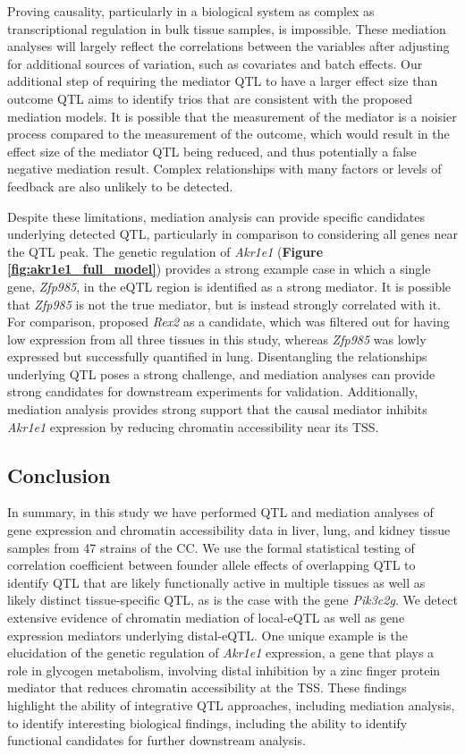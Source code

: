 \documentclass[9pt,twocolumn,twoside]{gsajnl}
\begin{document}
Proving causality, particularly in a biological system as complex as transcriptional regulation in bulk tissue samples, is impossible. These mediation analyses will largely reflect the correlations between the variables after adjusting for additional sources of variation, such as covariates and batch effects. Our additional step of requiring the mediator QTL to have a larger effect size than outcome QTL aims to identify trios that are consistent with the proposed mediation models. It is possible that the measurement of the mediator is a noisier process compared to the measurement of the outcome, which would result in the effect size of the mediator QTL being reduced, and thus potentially a false negative mediation result. Complex relationships with many factors or levels of feedback are also unlikely to be detected.

Despite these limitations, mediation analysis can provide specific candidates underlying detected QTL, particularly in comparison to considering all genes near the QTL peak. The genetic regulation of \textit{Akr1e1} (\textbf{Figure \ref{fig:akr1e1_full_model}}) provides a strong example case in which a single gene, \textit{Zfp985}, in the eQTL region is identified as a strong mediator. It is possible that \textit{Zfp985} is not the true mediator, but is instead strongly correlated with it. For comparison, \cite{HamiltonWilliams2013} proposed \textit{Rex2} as a candidate, which was filtered out for having low expression from all three tissues in this study, whereas \textit{Zfp985} was lowly expressed but successfully quantified in lung. Disentangling the relationships underlying QTL poses a strong challenge, and mediation analyses can provide strong candidates for downstream experiments for validation. Additionally, mediation analysis provides strong support that the causal mediator inhibits \textit{Akr1e1} expression by reducing chromatin accessibility near its TSS.

\subsection{Conclusion}

In summary, in this study we have performed QTL and mediation analyses of gene expression and chromatin accessibility data in liver, lung, and kidney tissue samples from 47 strains of the CC. We use the formal statistical testing of correlation coefficient between founder allele effects of overlapping QTL to identify QTL that are likely functionally active in multiple tissues as well as likely distinct tissue-specific QTL, as is the case with the gene \textit{Pik3c2g}. We detect extensive evidence of chromatin mediation of local-eQTL as well as gene expression mediators underlying distal-eQTL. One unique example is the elucidation of the genetic regulation of \textit{Akr1e1} expression, a gene that plays a role in glycogen metabolism, involving distal inhibition by a zinc finger protein mediator that reduces chromatin accessibility at the TSS. These findings highlight the ability of integrative QTL approaches, including mediation analysis, to identify interesting biological findings, including the ability to identify functional candidates for further downstream analysis.
\end{document}
